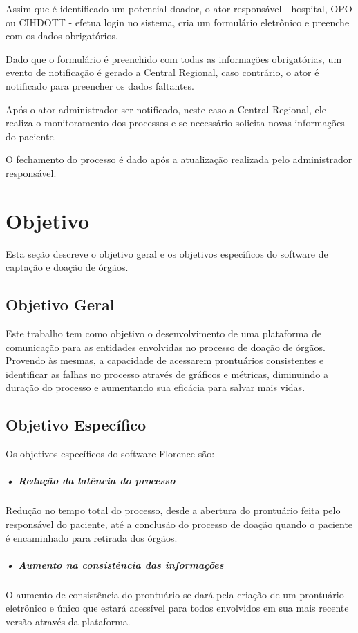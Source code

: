 \documentclass[portuguese,oneside]{tcc}
\begin{document}
Assim que é identificado um potencial doador, o ator responsável - hospital, OPO ou CIHDOTT - efetua login no sistema, cria um formulário eletrônico e preenche com os dados obrigatórios.

Dado que o formulário é preenchido com todas as informações obrigatórias, um evento de notificação é gerado a Central Regional, caso contrário, o ator é notificado para preencher os dados faltantes.

Após o ator administrador ser notificado, neste caso a Central Regional, ele realiza o monitoramento dos processos e se necessário solicita novas informações do paciente.

O fechamento do processo é dado após a atualização realizada pelo administrador responsável.

\section{Objetivo}
Esta seção descreve o objetivo geral e os objetivos específicos do software de captação e doação de órgãos.


\subsection{Objetivo Geral}
Este trabalho tem como objetivo o desenvolvimento de uma plataforma de comunicação para as entidades envolvidas no processo de doação de órgãos. Provendo às mesmas, a capacidade de acessarem prontuários consistentes e identificar as falhas no processo através de gráficos e métricas, diminuindo a duração do processo e aumentando sua eficácia para salvar mais vidas.


\subsection{Objetivo Específico}
Os objetivos específicos do software Florence são:

\subparagraph{• Redução da latência do processo}

Redução no tempo total do processo, desde a abertura do prontuário feita pelo responsável do paciente, até a conclusão do processo de doação quando o paciente é encaminhado para retirada dos órgãos.

\subparagraph{• Aumento na consistência das informações}

O aumento de consistência do prontuário se dará pela criação de um prontuário eletrônico e único que estará acessível para todos envolvidos em sua mais recente versão através da plataforma.
\end{document}
